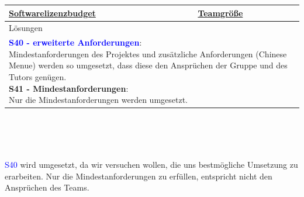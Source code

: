 \documentclass[enabledeprecatedfontcommands,fontsize=11pt,paper=a4,twoside]{scrartcl}
\newcounter{one}
\newcommand{\cb}[1]{{\textcolor{blue}{#1}}}
\begin{document}
\begin{tabular} {|p{8cm} p{8cm}|}
		\hyperlink {ww}{Softwarelizenzbudget} &
		\hyperlink {xx}{Teamgröße} 
		\\ \hline
		\multicolumn{2}{|l|}{Lösungen} \\
		\multicolumn{2}{|l|}{\parbox{16cm}{
				\textbf{\cb{\hypertarget{nnn}{S40 - erweiterte Anforderungen}}}: \\
				Mindestanforderungen des Projektes und zusätzliche Anforderungen (Chinese Menue) werden so umgesetzt, dass diese den Ansprüchen der Gruppe und des Tutors genügen. \\
				\textbf{S41 - Mindestanforderungen}: \\
				Nur die Mindestanforderungen werden umgesetzt. \\
		} }\\ [6ex] \hline
	\end{tabular}\\ \\ \\
	\begin{onehalfspace}
		\cb{S40} wird umgesetzt, da wir versuchen wollen, die uns bestmögliche Umsetzung zu erarbeiten. Nur die Mindestanforderungen zu erfüllen, entspricht nicht den Ansprüchen des Teams.
	\end{onehalfspace}
	
\end{document}
